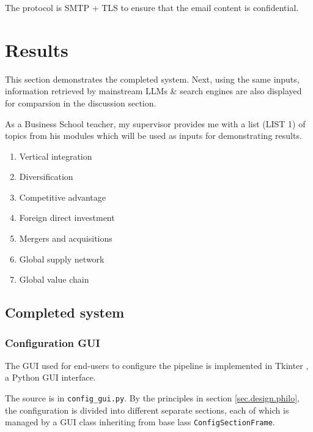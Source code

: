 \documentclass[final-report]{report-template}
\newcommand\ttb{\discretionary{}{}{}}
\begin{document}
The protocol is SMTP + TLS to ensure that the email content is confidential.


\section{Results}
This section demonstrates the completed system.  Next, using the same inputs,
information retrieved by mainstream LLMs \& search engines are also displayed
for comparsion in the discussion section.

As a Business School teacher, my supervisor provides me with a list (LIST 1) of
topics from his modules which will be used as inputs for demonstrating results.
\begin{enumerate}
	\item Vertical integration
	\item Diversification 
	\item Competitive advantage
	\item Foreign direct investment
	\item Mergers and acquisitions
	\item Global supply network
	\item Global value chain
\end{enumerate}

\subsection{Completed system}
\subsubsection{Configuration GUI}
The GUI used for end-users to configure the pipeline is implemented in Tkinter
\cite{tkinter}, a Python GUI interface. 

The source is in \verb!config_gui.py!. By the principles in section
\ref{sec.design.philo}, the configuration is divided into different separate
sections, each of which is managed by a GUI class inheriting from base lass
\texttt{Config\ttb Section\ttb Frame}.
\end{document}
